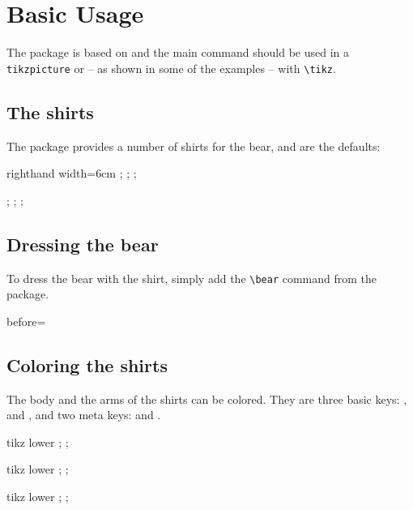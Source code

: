  \section{Basic Usage}

 The package is based on \TikZ{} and the main command should be used in a \texttt{tikzpicture} or -- as shown in some of the examples -- with \verb+\tikz+.

 \subsection{The shirts}
 The package provides a number of shirts for the bear,  and  are the defaults:
 \begin{tcblisting}{righthand width=6cm}
 \tikz{};
 \tikz\bearwear
   [t-shirt];
 \tikz{};

 \tikz\bearwear
   [v-neckline];
 \tikz{};
 \tikz{};
  \end{tcblisting}

 \subsection{Dressing the bear}

 To dress the bear with the shirt, simply add the \verb+\bear+ command from the  package.

 \begin{tcblisting}{before=\parindent0pt\nopagebreak}
 \tikz{\bear;\bearwear[v-neckline];}
  \end{tcblisting}

 \subsection{Coloring the shirts}

 The body and the arms of the shirts can be colored. They are three basic keys: ,  and , and two meta keys:  and .

 \begin{tcblisting}{tikz lower}
  \bear;
  \bearwear
    [v-neckline,
     leftarm=red,
     rightarm=green,
     body=blue];
 \end{tcblisting}
 \begin{tcblisting}{tikz lower}
  \bear;
  \bearwear[arms=green];
 \end{tcblisting}
 \begin{tcblisting}{tikz lower}
  \bear;
  \bearwear
    [shirt=
      {shade,
       top color=blue,
       bottom color=red}];
 \end{tcblisting}

